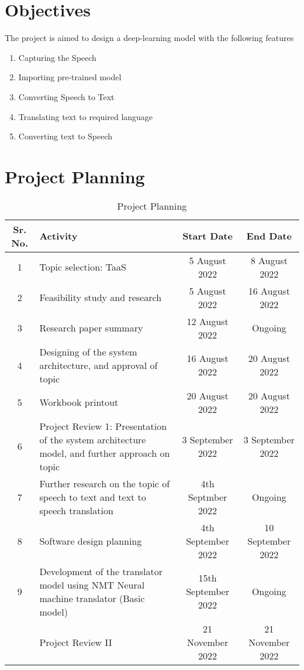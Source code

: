 \section{Objectives}
The project is aimed to design a deep-learning model with the following features
\begin{enumerate}
    \item Capturing the Speech
    \item Importing pre-trained model
    \item Converting Speech to Text
    \item Translating text to required language
    \item Converting text to Speech 
\end{enumerate}

\newpage

\section{Project Planning}
\begin{table}[htbp]
   
\begin{tabular}{|c|>{\centering\arraybackslash} p{5cm}|c|c|}
    \hline
    Sr. No. & Activity & Start Date & End Date \\
    \hline
    \hline
    1 & Topic selection: TaaS & 5 August 2022 & 8 August 2022 \\
    \hline
    2 & Feasibility study and research & 5 August 2022 & 16 August 2022 \\
    \hline
    3 & Research paper summary & 12 August 2022 & Ongoing \\
    \hline
    4 & Designing of the system architecture, and approval of topic & 16 August 2022 & 20 August 2022\\
    \hline
    5 & Workbook printout & 20 August 2022 & 20 August 2022 \\
    \hline
    6 & Project Review 1: Presentation of the system architecture model, and further approach on topic & 3 September 2022 & 3 September 2022 \\
    \hline
    7 & Further research on the topic of speech to text and text to speech translation & 4th Septmber 2022 & Ongoing \\
    \hline
    8 & Software design planning & 4th September 2022 & 10 September 2022 \\
    \hline
    9 & Development of the translator model using NMT Neural machine translator (Basic model) &15th September 2022 & Ongoing \\
    \hline
    & Project Review II & 21 November 2022 & 21 November 2022 \\
    \hline
    
\end{tabular}
    \caption{Project Planning}
    \label{tab:my_label}
\end{table}